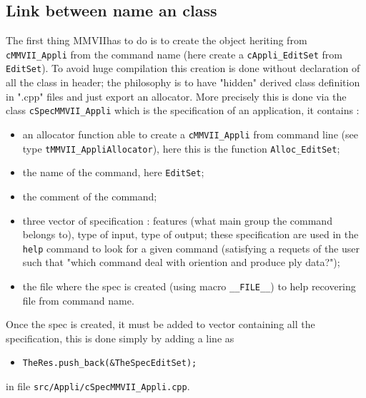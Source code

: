 \documentclass[a4paper]{book}
\newcommand{\PPP}{MMVII}
\begin{document}

\subsection{Link between name an class}

The first thing \PPP has to do is to create the object heriting
from {\tt cMMVII\_Appli} from the command name (here create a {\tt cAppli\_EditSet}
from  {\tt EditSet}). To avoid huge compilation this creation is done
without declaration of all the class in header; the philosophy is to have
"hidden"  derived class definition in ".cpp" files  and just export an allocator.
More precisely this is done via the class {\tt cSpecMMVII\_Appli} which is
the specification of an application, it contains :

\begin{itemize}
   \item an allocator function able to create a {\tt cMMVII\_Appli} from command line
         (see type {\tt tMMVII\_AppliAllocator}), here this is the function {\tt Alloc\_EditSet};

   \item the name of the command, here {\tt EditSet};

   \item the comment of the command;

   \item three vector of specification : features (what main group the command belongs to), type
         of input, type of output;  these specification are used in the {\tt help} command to 
         look for a given command (satisfying a requets of the user such that "which command deal with oriention
         and produce ply data?");

   \item the file where the spec is created (using macro {\tt \_\_FILE\_\_}) to help recovering file from 
         command name.
\end{itemize}

Once the spec is created, it must be added to vector containing all the 
specification, this is done simply by adding a line as 
\begin{itemize}
   \item {\tt  TheRes.push\_back(\&TheSpecEditSet);} 
\end{itemize}

in file {\tt src/Appli/cSpecMMVII\_Appli.cpp}.


\end{document}
